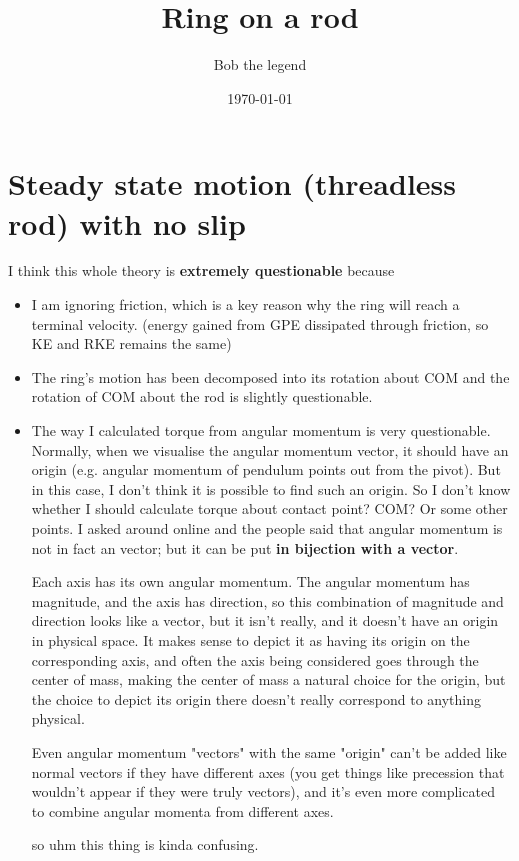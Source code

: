 \documentclass{scrartcl}
\begin{document}
\title{Ring on a rod}
\author{Bob the legend}
\date{\today}
\setlength\parindent{0pt}


\maketitle

\section{Steady state motion (threadless rod) with no slip}

I think this whole theory is \textbf{extremely questionable} because
\begin{itemize}
    \item I am ignoring friction, which is a key reason why the ring will reach a terminal velocity. (energy gained from GPE dissipated through friction, so KE and RKE remains the same)
    \item The ring's motion has been decomposed into its rotation about COM and the rotation of COM about the rod is slightly questionable.
    \item The way I calculated torque from angular momentum is very questionable. Normally, when we visualise the angular momentum vector, it should have an origin (e.g. angular momentum of pendulum points out from the pivot). But in this case, I don't think it is possible to find such an origin. So I don't know whether I should calculate torque about contact point? COM? Or some other points. I asked around online and the people said that angular momentum is not in fact an vector; but it can be put \textbf{in bijection with a vector}.
          \begin{mybox}
              Each axis has its own angular momentum. The angular momentum has magnitude, and the axis has direction, so this combination of magnitude and direction looks like a vector, but it isn't really, and it doesn't have an origin in physical space. It makes sense to depict it as having its origin on the corresponding axis, and often the axis being considered goes through the center of mass, making the center of mass a natural choice for the origin, but the choice to depict its origin there doesn't really correspond to anything physical.

              Even angular momentum "vectors" with the same "origin" can't be added like normal vectors if they have different axes (you get things like precession that wouldn't appear if they were truly vectors), and it's even more complicated to combine angular momenta from different axes.
          \end{mybox}
          so uhm this thing is kinda confusing.
\end{itemize}
\end{document}
